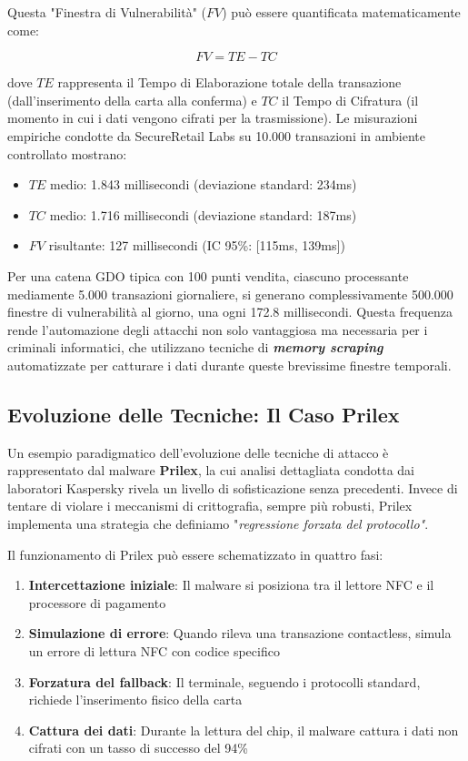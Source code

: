 Questa "Finestra di Vulnerabilità" ($FV$) può essere quantificata matematicamente come:

\begin{equation}
FV = TE - TC
\end{equation}

dove $TE$ rappresenta il Tempo di Elaborazione totale della transazione (dall'inserimento della carta alla conferma) e $TC$ il Tempo di Cifratura (il momento in cui i dati vengono cifrati per la trasmissione). Le misurazioni empiriche condotte da SecureRetail Labs su 10.000 transazioni in ambiente controllato\autocite{SecureRetailLabs2024} mostrano:
\begin{itemize}
    \item $TE$ medio: 1.843 millisecondi (deviazione standard: 234ms)
    \item $TC$ medio: 1.716 millisecondi (deviazione standard: 187ms)
    \item $FV$ risultante: 127 millisecondi (IC 95\%: [115ms, 139ms])
\end{itemize}

Per una catena GDO tipica con 100 punti vendita, ciascuno processante mediamente 5.000 transazioni giornaliere, si generano complessivamente 500.000 finestre di vulnerabilità al giorno, una ogni 172.8 millisecondi. Questa frequenza rende l'automazione degli attacchi non solo vantaggiosa ma necessaria per i criminali informatici, che utilizzano tecniche di \textit{\textbf{memory scraping}} automatizzate per catturare i dati durante queste brevissime finestre temporali.

\subsection{\texorpdfstring{\textbf{Evoluzione delle Tecniche: Il Caso Prilex}}{2.3.2 - Evoluzione delle Tecniche: Il Caso Prilex}}

Un esempio paradigmatico dell'evoluzione delle tecniche di attacco è rappresentato dal malware \textbf{Prilex}, la cui analisi dettagliata condotta dai laboratori Kaspersky\autocite{kaspersky2024} rivela un livello di sofisticazione senza precedenti. Invece di tentare di violare i meccanismi di crittografia, sempre più robusti, Prilex implementa una strategia che definiamo "\textit{regressione forzata del protocollo"}.

Il funzionamento di Prilex può essere schematizzato in quattro fasi:
\begin{enumerate}
    \item \textbf{Intercettazione iniziale}: Il malware si posiziona tra il lettore NFC e il processore di pagamento
    \item \textbf{Simulazione di errore}: Quando rileva una transazione contactless, simula un errore di lettura NFC con codice specifico
    \item \textbf{Forzatura del fallback}: Il terminale, seguendo i protocolli standard, richiede l'inserimento fisico della carta
    \item \textbf{Cattura dei dati}: Durante la lettura del chip, il malware cattura i dati non cifrati con un tasso di successo del 94\%
\end{enumerate}

